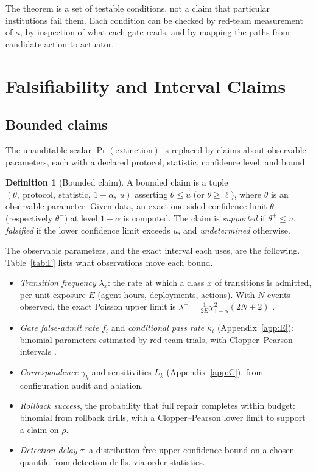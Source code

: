\documentclass[11pt]{article}
\theoremstyle{definition}
\newtheorem{definition}[theorem]{Definition}
\begin{document}
The theorem is a set of testable conditions, not a claim that particular institutions fail them. Each condition can be checked by red-team measurement of $\kappa$, by inspection of what each gate reads, and by mapping the paths from candidate action to actuator.

\section{Falsifiability and Interval Claims}\label{app:F}

\subsection{Bounded claims}

The unauditable scalar $\Pr(\text{extinction})$ is replaced by claims about observable parameters, each with a declared protocol, statistic, confidence level, and bound.

\begin{definition}[Bounded claim]
A bounded claim is a tuple $(\theta,\ \text{protocol},\ \text{statistic},\ 1-\alpha,\ u)$ asserting $\theta\le u$ (or $\theta\ge\ell$), where $\theta$ is an observable parameter. Given data, an exact one-sided confidence limit $\theta^+$ (respectively $\theta^-$) at level $1-\alpha$ is computed. The claim is \emph{supported} if $\theta^+\le u$, \emph{falsified} if the lower confidence limit exceeds $u$, and \emph{undetermined} otherwise.
\end{definition}

The observable parameters, and the exact interval each uses, are the following. Table~\ref{tab:F} lists what observations move each bound.

\begin{itemize}[leftmargin=1.6em,itemsep=0.1em]
\item \emph{Transition frequency} $\lambda_x$: the rate at which a class $x$ of transitions is admitted, per unit exposure $E$ (agent-hours, deployments, actions). With $N$ events observed, the exact Poisson upper limit is $\lambda^+=\tfrac{1}{2E}\chi^2_{1-\alpha}(2N+2)$ \cite{garwood1936}.
\item \emph{Gate false-admit rate} $f_i$ and \emph{conditional pass rate} $\kappa_i$ (Appendix~\ref{app:E}): binomial parameters estimated by red-team trials, with Clopper--Pearson intervals \cite{clopper1934}.
\item \emph{Correspondence} $\gamma_k$ and sensitivities $L_k$ (Appendix~\ref{app:C}), from configuration audit and ablation.
\item \emph{Rollback success}, the probability that full repair completes within budget: binomial from rollback drills, with a Clopper--Pearson lower limit to support a claim on $\rho$.
\item \emph{Detection delay} $\tau$: a distribution-free upper confidence bound on a chosen quantile from detection drills, via order statistics.
\end{itemize}
\end{document}
